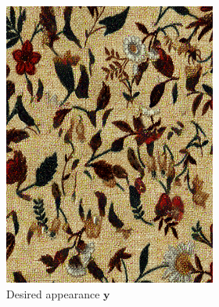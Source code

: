 \begin{figure}[]
    \begin{subfigure}{\textwidth}
        \centering
        \begin{subfigure}{0.2\textwidth}
            \centering
            \includegraphics[width=\textwidth]{images/04-experiment02/human/flowers2/target.jpg}
            \caption*{Desired appearance \(\bm{y}\)}
        \end{subfigure}
        \hfill
        \begin{subfigure}{0.78\textwidth}
            \centering
            \begin{subfigure}{0.32\textwidth}
                \centering
                \begin{tikzpicture}

\end{tikzpicture}
\end{subfigure}
\end{subfigure}
\end{subfigure}
\end{figure}
